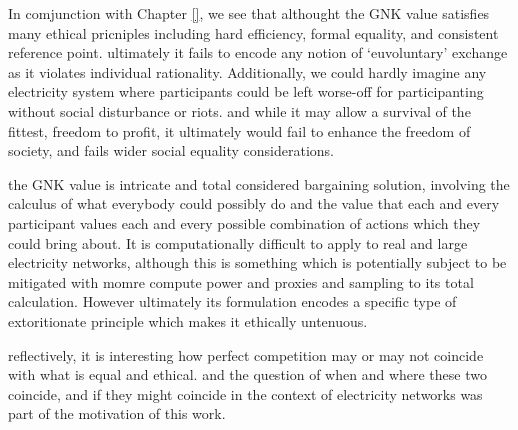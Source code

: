 In comjunction with Chapter \ref{}, we see that althought the GNK value satisfies many ethical pricniples including hard efficiency, formal equality, and consistent reference point.
ultimately it fails to encode any notion of `euvoluntary' exchange as it violates individual rationality.
Additionally, we could hardly imagine any electricity system where participants could be left worse-off for participanting without social disturbance or riots. and while it may allow a survival of the fittest, freedom to profit, it ultimately would fail to enhance the freedom of society, and fails wider social equality considerations. 

the GNK value is intricate and total considered bargaining solution, involving the calculus of what everybody could possibly do and the value that each and every participant values each and every possible combination of actions which they could bring about.
It is computationally difficult to apply to real and large electricity networks, although this is something which is potentially subject to be mitigated with momre compute power and proxies and sampling to its total calculation.
However ultimately its formulation encodes a specific type of extoritionate principle which makes it ethically untenuous.

reflectively, it is interesting how perfect competition may or may not coincide with what is equal and ethical.
and the question of when and where these two coincide, and if they might coincide in the context of electricity networks was part of the motivation of this work.





